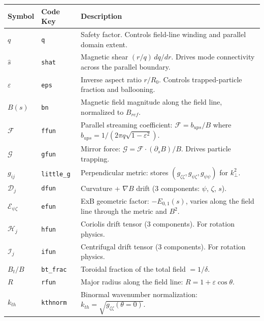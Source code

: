 \documentclass{article}
\theoremstyle{plain}
\theoremstyle{definition}
\theoremstyle{remark}
\begin{document}
\begin{longtable}{p{} p{} p{}}
\toprule
\textbf{Symbol} & \textbf{Code Key} & \textbf{Description} \\
\midrule
\endfirsthead
\midrule
\endhead
\bottomrule
\endfoot
$q$ & \texttt{q} & Safety factor. Controls field-line winding and parallel domain extent. \\
$\hat{s}$ & \texttt{shat} & Magnetic shear $(r/q)\,dq/dr$. Drives mode connectivity across the parallel boundary. \\
$\varepsilon$ & \texttt{eps} & Inverse aspect ratio $r/R_0$. Controls trapped-particle fraction and ballooning. \\
$B(s)$ & \texttt{bn} & Magnetic field magnitude along the field line, normalized to $B_{ref}$. \\
$\mathcal{F}$ & \texttt{ffun} & Parallel streaming coefficient: $\mathcal{F} = b_{ups}/B$ where $b_{ups} = 1/(2\pi q\sqrt{1-\varepsilon^2})$. \\
$\mathcal{G}$ & \texttt{gfun} & Mirror force: $\mathcal{G} = \mathcal{F} \cdot (\partial_s B)/B$. Drives particle trapping. \\
$g_{ij}$ & \texttt{little\_g} & Perpendicular metric: stores $(g_{\zeta\zeta}, g_{\psi\zeta}, g_{\psi\psi})$ for $k_\perp^2$. \\
$\mathcal{D}_j$ & \texttt{dfun} & Curvature + $\nabla B$ drift (3 components: $\psi$, $\zeta$, $s$). \\
$\mathcal{E}_{\psi\zeta}$ & \texttt{efun} & ExB geometric factor: $-E_{0,1}(s)$, varies along the field line through the metric and $B^2$. \\
$\mathcal{H}_j$ & \texttt{hfun} & Coriolis drift tensor (3 components). For rotation physics. \\
$\mathcal{I}_j$ & \texttt{ifun} & Centrifugal drift tensor (3 components). For rotation physics. \\
$B_t/B$ & \texttt{bt\_frac} & Toroidal fraction of the total field $= 1/\delta$. \\
$R$ & \texttt{rfun} & Major radius along the field line: $R = 1 + \varepsilon\cos\theta$. \\
$k_{th}$ & \texttt{kthnorm} & Binormal wavenumber normalization: $k_{th} = \sqrt{g_{\zeta\zeta}(\theta=0)}$. \\
\bottomrule
\end{longtable}
\end{document}
